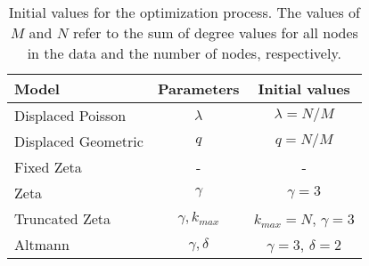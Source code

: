 \begin{table}[ht]
\centering
\begin{tabular}{@{}lcc@{}}
\toprule
Model               & Parameters            & Initial values \\ \midrule
Displaced Poisson   &  $\lambda$            & $\lambda = N/M$ \\
Displaced Geometric & $q$                   & $q = N/M$ \\
Fixed Zeta          & -                     & - \\
Zeta                & $\gamma$              & $\gamma = 3$ \\
Truncated Zeta      & $\gamma, k_{max}$     & $k_{max} = N$, $\gamma = 3$ \\
Altmann             & $\gamma, \delta$      & $\gamma = 3$, $\delta = 2$ \\ \bottomrule
\end{tabular}
\caption{Initial values for the optimization process. The values of $M$ and $N$ refer to the sum of degree values for all nodes in the data and the number of nodes, respectively.}\label{tab:initial_degseq}
\end{table}